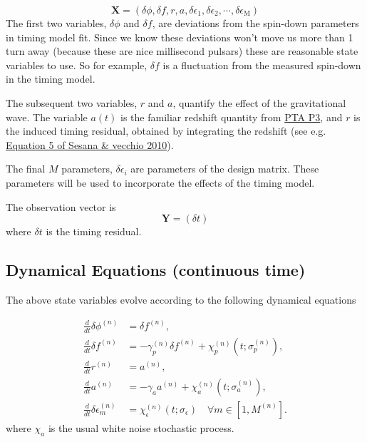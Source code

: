 \documentclass[]{scrartcl}
\begin{document}
\begin{equation}
	\boldsymbol{X} = \left(\delta \phi, \delta f, r,a,\delta \epsilon_1, \delta \epsilon_2, \cdots, \delta \epsilon_{\mathrm M} \right)
\end{equation}
The first two variables, $\delta \phi$ and $\delta f$, are deviations from the spin-down parameters in timing model fit. Since we know these deviations won’t move us more than 1 turn away (because these are nice millisecond pulsars) these are reasonable state variables to use. So for example, $\delta f$ is a fluctuation from the measured spin-down in the timing model. \newline 


\noindent The subsequent two variables, $r$ and $a$, quantify the effect of the gravitational wave. The variable $a(t)$ is the familiar redshift quantity from \href{https://arxiv.org/abs/2501.06990}{PTA P3}, and $r$ is the induced timing residual, obtained by integrating the redshift (see e.g. \href{https://arxiv.org/abs/1003.0677}{Equation 5 of Sesana \& vecchio 2010}). \newline 


\noindent The final $M$ parameters, $\delta \epsilon_i$ are parameters of the design matrix. These parameters will be used to incorporate the effects of the timing model. \newline 



\noindent The observation vector is 
\begin{equation}
	\boldsymbol{Y} = \left(\delta t \right)
\end{equation}
where $\delta t$ is the timing residual.


\subsection{Dynamical Equations (continuous time)}

The above state variables evolve according to the following dynamical equations 


\begin{align}
	\frac{d}{dt} \delta \phi^{(n)} &= \delta f^{(n)}, \\
	\frac{d}{dt} \delta f^{(n)} &= -\gamma_p^{(n)} \delta f^{(n)} + \chi_p^{(n)}(t;\sigma_p^{(n)}), \\
	\frac{d}{dt} r^{(n)} &= a^{(n)}, \\
	\frac{d}{dt} a^{(n)} &= -\gamma_a a^{(n)} + \chi_a^{(n)}(t;\sigma_a^{(n)}), \\
	\frac{d}{dt} \delta \epsilon^{(n)}_{m} &= \chi_\epsilon^{(n)}(t;\sigma_\epsilon) \quad \forall m \in [1, M^{(n)}].
\end{align}
where $\chi_a$ is the usual white noise stochastic process. \newline 
\end{document}
